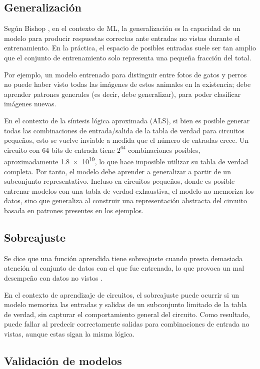 \subsection{Generalización}

Según Bishop \cite{bishop_pattern_2006}, en el contexto de ML, la
generalización es la capacidad de un modelo para producir respuestas correctas
ante entradas no vistas durante el entrenamiento. En la práctica, el espacio de
posibles entradas suele ser tan amplio que el conjunto de entrenamiento solo
representa una pequeña fracción del total.

Por ejemplo, un modelo entrenado para distinguir entre fotos de gatos y perros
no puede haber visto todas las imágenes de estos animales en la existencia;
debe aprender patrones generales (es decir, debe generalizar), para poder
clasificar imágenes nuevas.

En el contexto de la síntesis lógica aproximada (ALS), si bien es posible
generar todas las combinaciones de entrada/salida de la tabla de verdad para
circuitos pequeños, esto se vuelve inviable a medida que el número de entradas
crece. Un circuito con 64 bits de entrada tiene $2^{64}$ combinaciones
posibles, aproximadamente \num{1.8e19}, lo que hace imposible utilizar su tabla
de verdad completa. Por tanto, el modelo debe aprender a generalizar a partir
de un subconjunto representativo. Incluso en circuitos pequeños, donde es
posible entrenar modelos con una tabla de verdad exhaustiva, el modelo no
memoriza los datos, sino que generaliza al construir una representación
abstracta del circuito basada en patrones presentes en los ejemplos.

\subsection{Sobreajuste}

Se dice que una función aprendida tiene sobreajuste cuando presta demasiada
atención al conjunto de datos con el que fue entrenada, lo que provoca un mal
desempeño con datos no vistos \cite{russell2016artificial}.

En el contexto de aprendizaje de circuitos, el sobreajuste puede ocurrir si un
modelo memoriza las entradas y salidas de un subconjunto limitado de la tabla
de verdad, sin capturar el comportamiento general del circuito. Como resultado,
puede fallar al predecir correctamente salidas para combinaciones de entrada no
vistas, aunque estas sigan la misma lógica.

\subsection{Validación de modelos}

